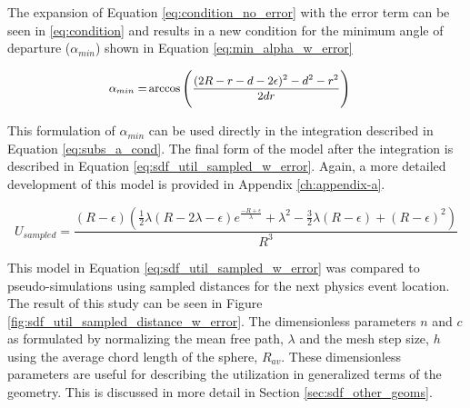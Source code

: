 The expansion of Equation \eqref{eq:condition_no_error} with the error term can be seen
in \eqref{eq:condition} and results in a new condition for the minimum angle of
departure ($\alpha_{min}$) shown in Equation \eqref{eq:min_alpha_w_error}

\begin{equation}
\small
\begin{split}
\alpha_{min} =& \arccos\Bigg ( \frac{(2R-r-d-2\epsilon)^2-d^2-r^2}{2 d r} \Bigg )
\end{split}
\label{eq:min_alpha_w_error}
\end{equation}

This formulation of $\alpha_{min}$ can be used directly in the integration described
in Equation \eqref{eq:subs_a_cond}. The final form of the model after the
integration is described in Equation \eqref{eq:sdf_util_sampled_w_error}. Again, a
more detailed development of this model is provided in Appendix \ref{ch:appendix-a}.

\begin{equation}
  U_{sampled} = \frac{(R-\epsilon) (\frac{1}{2} \lambda ( R - 2\lambda - \epsilon ) e^{\frac{-R + \epsilon}{\lambda}} + \lambda^{2} - \frac{3}{2}\lambda(R - \epsilon) + (R-\epsilon)^{2})}{R^3}
  \label{eq:sdf_util_sampled_w_error}
\end{equation}



This model in Equation \eqref{eq:sdf_util_sampled_w_error} was compared to
pseudo-simulations using sampled distances for the next physics event
location. The result of this study can be seen in Figure
\ref{fig:sdf_util_sampled_distance_w_error}. The dimensionless parameters $n$
and $c$ as formulated by normalizing the mean free path, $\lambda$ and the mesh
step size, $h$ using the average chord length of the sphere, $R_{av}$. These
dimensionless parameters are useful for describing the utilization in
generalized terms of the geometry. This is discussed in more detail in
Section \ref{sec:sdf_other_geoms}.

